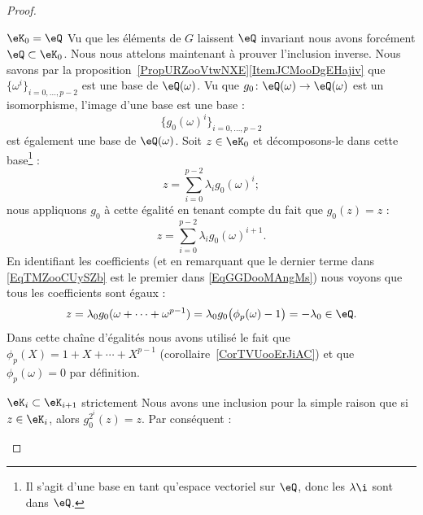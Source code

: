 \begin{proof}
\begin{subproof}
\begin{subproof}
                \item[\( \eK_0=\eQ\)]
                    Vu que les éléments de \( G\) laissent \( \eQ\) invariant nous avons forcément \( \eQ\subset \eK_0\). Nous nous attelons maintenant à prouver l'inclusion inverse. Nous savons par la proposition~\ref{PropURZooVtwNXE}\ref{ItemJCMooDgEHajiv} que \( \{ \omega^i \}_{i=0,\ldots, p-2}\) est une base de \( \eQ(\omega)\). Vu que \( g_0\colon \eQ(\omega)\to \eQ(\omega)\) est un isomorphisme, l'image d'une base est une base :
                    \begin{equation}
                        \{ g_0(\omega)^i \}_{i=0,\ldots, p-2}
                    \end{equation}
                    est également une base de \( \eQ(\omega)\). Soit \( z\in \eK_0\) et décomposons-le dans cette base\footnote{Il s'agit d'une base en tant qu'espace vectoriel sur \( \eQ\), donc les \( \lambda\i\) sont dans \( \eQ\).} :
                    \begin{equation}    \label{EqTMZooCUySZb}
                        z=\sum_{i=0}^{p-2}\lambda_i g_0(\omega)^i;
                    \end{equation}
                    nous appliquons \( g_0\) à cette égalité en tenant compte du fait que \( g_0(z)=z\) :
                    \begin{equation}    \label{EqGGDooMAngMs}
                        z=\sum_{i=0}^{p-2}\lambda_ig_0(\omega)^{i+1}.
                    \end{equation}
                    En identifiant les coefficients (et en remarquant que le dernier terme dans \eqref{EqTMZooCUySZb} est le premier dans \eqref{EqGGDooMAngMs}) nous voyons que tous les coefficients sont égaux :
                    \begin{equation}
                        z=\lambda_0g_0(\omega+\cdots +\omega^{p-1})=\lambda_0g_0\big( \phi_p(\omega)-1 \big)=-\lambda_0\in \eQ.
                    \end{equation}
                    Dans cette chaîne d'égalités nous avons utilisé le fait que \( \phi_p(X)=1+X+\cdots +X^{p-1}\) (corollaire~\ref{CorTVUooErJiAC}) et que \( \phi_p(\omega)=0\) par définition.
                    \item[\( \eK_i\subset \eK_{i+1}\) strictement]
                        Nous avons une inclusion pour la simple raison que si \( z\in \eK_i\), alors \( g_0^{2^i}(z)=z\). Par conséquent :

\end{subproof}
\end{subproof}
\end{proof}

